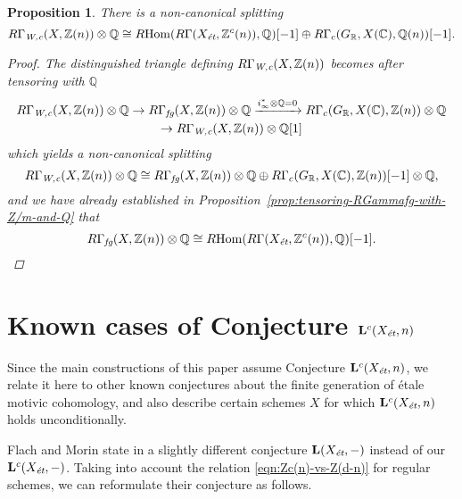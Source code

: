 \documentclass[leqno,12pt]{article}
\theoremstyle{plain}
\newtheorem{proposition}[theorem]{\indent\sc Proposition}
\theoremstyle{definition}
\DeclareMathOperator{\Hom}{Hom}
\newcommand{\CC}{\mathbb{C}}
\newcommand{\QQ}{\mathbb{Q}}
\newcommand{\RR}{\mathbb{R}}
\newcommand{\ZZ}{\mathbb{Z}}
\newcommand{\Wc}{\text{\it W,c}}
\newcommand{\et}{\text{\it \'{e}t}}
\newcommand{\fg}{\text{\it fg}}
\newcommand{\RHom}{R\!\Hom}
\begin{document}
\begin{proposition}
  There is a non-canonical splitting
  \[ R\Gamma_\Wc (X, \ZZ(n)) \otimes \QQ \cong
    \RHom (R\Gamma (X_\et, \ZZ^c (n)), \QQ) [-1] \oplus
    R\Gamma_c (G_\RR, X (\CC), \QQ (n)) [-1]. \]

  \begin{proof}
    The distinguished triangle defining $R\Gamma_\Wc (X, \ZZ(n))$ becomes after
    tensoring with $\QQ$
    \begin{multline*}
      R\Gamma_\Wc (X, \ZZ (n))\otimes \QQ \to
      R\Gamma_\fg (X, \ZZ(n))\otimes \QQ \xrightarrow{i_\infty^*\otimes\QQ = 0}
      R\Gamma_c (G_\RR, X (\CC), \ZZ(n))\otimes \QQ \\
      \to R\Gamma_\Wc (X, \ZZ (n))\otimes \QQ [1]
    \end{multline*}
    which yields a non-canonical splitting \cite[Chapitre~II,
    Corollaire~1.2.6]{Verdier-thesis}
    \[ R\Gamma_\Wc (X, \ZZ (n))\otimes \QQ \cong
      R\Gamma_\fg (X, \ZZ(n))\otimes \QQ \oplus
      R\Gamma_c (G_\RR, X (\CC), \ZZ(n)) [-1]\otimes \QQ, \]
    and we have already established in
    Proposition~\ref{prop:tensoring-RGammafg-with-Z/m-and-Q} that
    \[ R\Gamma_\fg (X, \ZZ (n)) \otimes \QQ \cong
      \RHom (R\Gamma (X_\et, \ZZ^c (n)), \QQ) [-1]. \qedhere \]
  \end{proof}
\end{proposition}


\section{Known cases of Conjecture $\mathbf{L}^c (X_\et,n)$}
\label{sec:known-cases-of-Lc-Xet-n}

Since the main constructions of this paper assume Conjecture
$\mathbf{L}^c (X_\et,n)$, we relate it here to other known conjectures about the
finite generation of \'{e}tale motivic cohomology, and also describe certain
schemes $X$ for which $\mathbf{L}^c (X_\et,n)$ holds unconditionally.

\vspace{1em}

Flach and Morin state in \cite{Flach-Morin-2018} a slightly different conjecture
$\mathbf{L} (X_\et, -)$ instead of our $\mathbf{L}^c (X_\et,-)$. Taking into
account the relation \eqref{eqn:Zc(n)-vs-Z(d-n)} for regular schemes, we can
reformulate their conjecture as follows.
\end{document}
